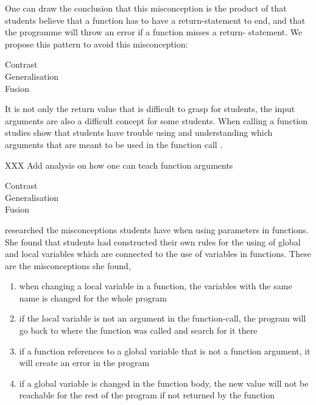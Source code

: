 One can draw the conclusion that this misconception is the product of that 
students believe that a function has to have a return-statement to end, and 
that the programme will throw an error if a function misses a return-
statement. We propose this pattern to avoid this misconception:

\begin{description}
    \item[Contrast]
    \item[Generalisation]
    \item[Fusion]
\end{description}

It is not only the return value that is difficult to grasp for students, the 
input arguments are also a difficult concept for some students. When 
calling a 
function studies show that students have trouble using and understanding 
which 
arguments that are meant to be used in the function call 
\parencite{AltadmriBrown2015}. 

XXX Add analysis on how one can teach function arguments

\begin{description}
    \item[Contrast]
    \item[Generalisation]
    \item[Fusion]
\end{description}


\Textcite{Fleury1991} researched the 
misconceptions students have when using parameters in functions.
She found that students had constructed their own rules for the using 
of global and local variables which are connected to the use of variables in 
functions. These are the misconceptions she found, 

\begin{enumerate}
    \item when changing a local variable in a function, the variables with 
the same name is changed for the whole program

    \item if the local variable is not an argument in the function-call, 
the program will go back to where the function was called and search 
for it there

    \item if a function references to a global variable that is not a 
function argument, it will create an error in the program

    \item if a global variable is changed in the function body, the new 
value will not be reachable for the rest of the program if not returned 
by the function
\end{enumerate}

